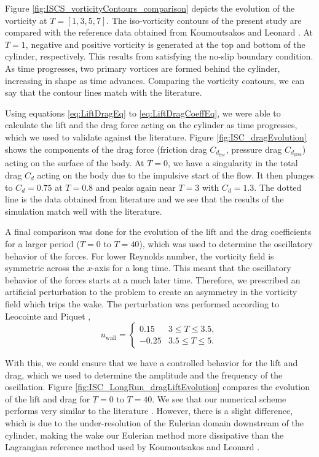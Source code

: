 Figure \ref{fig:ISCS_vorticityContours_comparison} depicts the evolution of the vorticity at $T=[1,3,5,7]$. The iso-vorticity contours of the present study are compared with the reference data obtained from Koumoutsakos and Leonard \cite{Koumoutsakos1995a}. At $T=1$, negative and positive vorticity is generated at the top and bottom of the cylinder, respectively. This results from satisfying the no-slip boundary condition. As time progresses, two primary vortices are formed behind the cylinder, increasing in shape as time advances. Comparing the vorticity contours, we can say that the contour lines match with the literature. 

Using equations \ref{eq:LiftDragEq} to \ref{eq:LiftDragCoeffEq}, we were able to calculate the lift and the drag force acting on the cylinder as time progresses, which we used to validate against the literature. Figure \ref{fig:ISC_dragEvolution} shows the components of the drag force (friction drag $C_{d_{\mathrm{fric}}}$, pressure drag $C_{d_{\mathrm{pres}}}$) acting on the surface of the body. At $T=0$, we have a singularity in the total drag $C_d$ acting on the body due to the impulsive start of the flow. It then plunges to $C_d=0.75$ at $T=0.8$ and peaks again near $T=3$ with $C_d=1.3$. The dotted line is the data obtained from literature \cite{Koumoutsakos1995a} and we see that the results of the simulation match well with the literature.

A final comparison was done for the evolution of the lift and the drag coefficients for a larger period ($T=0$ to $T=40$), which was used to determine the oscillatory behavior of the forces. For lower Reynolds number, the vorticity field is symmetric across the $x$-axis for a long time. This meant that the oscillatory behavior of the forces starts at a much later time. Therefore, we prescribed an artificial perturbation to the problem to create an asymmetry in the vorticity field which trips the wake. The perturbation was performed according to Leocointe and Piquet \cite{Lecointe1984},
	\begin{equation}
	 u_{\mathrm{wall}} = \begin{cases}
	 0.15 & 3 \leqslant T \leqslant 3.5, \\
	 -0.25 & 3.5 \leqslant T \leqslant 5.
	 \end{cases}
	\label{eq:perturbation}
	\end{equation}
	
With this, we could ensure that we have a controlled behavior for the lift and drag, which we used to determine the amplitude and the frequency of the oscillation. Figure \ref{fig:ISC_LongRun_dragLiftEvolution} compares the evolution of the lift and drag for $T=0$ to $T=40$. We see that our numerical scheme performs very similar to the literature \cite{MosheRosenFeldDochanKwak1991}. However, there is a slight difference, which is due to the under-resolution of the Eulerian domain downstream of the cylinder, making the wake our Eulerian method more dissipative than the Lagrangian reference method used by Koumoutsakos and Leonard \cite{Koumoutsakos1995a}.


